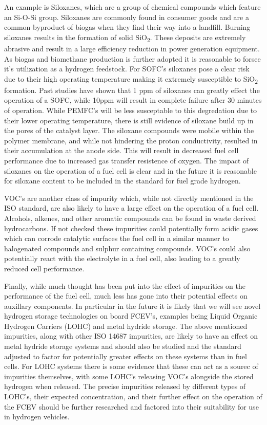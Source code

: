 An example is Siloxanes, which are a group of chemical compounds which feature an Si-O-Si group. Siloxanes are commonly found in consumer goods and are a common byproduct of biogas when they find their way into a landfill. Burning siloxanes results in the formation of solid SiO\textsubscript{2}. These deposits are extremely abrasive and result in a large efficiency reduction in power generation equipment. As biogas and biomethane production is further adopted it is reasonable to forsee it's utilization as a hydrogen feedstock. For SOFC's siloxanes pose a clear risk due to their high operating temperature making it extremely susceptible to SiO\textsubscript{2} formation. Past studies have shown that 1 ppm of siloxanes can greatly effect the operation of a SOFC, while 10ppm will result in complete failure after 30 minutes of operation. \cite{d.d._s._r._2011} While PEMFC's will be less susceptable to this degredation due to their lower operating temperature, there is still evidence of siloxane build up in the pores of the catalyst layer. \cite{SEO201644} The siloxane compounds were mobile within the polymer membrane, and while not hindering the proton conductivity, resulted in their accumulation at the anode side. \cite{SEO201644} This will result in decreased fuel cell performance due to increased gas transfer resistence of oxygen. The impact of siloxanes on the operation of a fuel cell is clear and in the future it is reasonable for siloxane content to be included in the standard for fuel grade hydrogen.

VOC's are another class of impurity which, while not directly mentioned in the ISO standard, are also likely to have a large effect on the operation of a fuel cell. Alcohols, alkenes, and other aromatic compounds can be found in waste derived hydrocarbons. If not checked these impurities could potentially form acidic gases which can corrode catalytic surfaces the fuel cell in a similar manner to halogenated compounds and sulphur containing compounds. \cite{d.d._s._r._2011} VOC's could also potentially react with the electrolyte in a fuel cell, also leading to a greatly reduced cell performance. \cite{Kortsdottir_2013}

Finally, while much thought has been put into the effect of impurities on the performance of the fuel cell, much less has gone into their potential effects on auxillary components. In particular in the future it is likely that we will see novel hydrogen storage technologies on board FCEV's, examples being Liquid Organic Hydrogen Carriers (LOHC) and metal hydride storage. The above mentioned impurities, along with other ISO 14687 impurities, are likely to have an effect on metal hydride storage systems and should also be studied and the standard adjusted to factor for potentially greater effects on these systems than in fuel cells. \cite{C001657H} For LOHC systems there is some evidence that these can act as a sourec of impurities themselves, with some LOHC's releasing VOC's alongside the stored hydrogen when released.\cite{BULGARIN2020712} The precise impurities released by different types of LOHC's, their expected concentration, and their further effect on the operation of the FCEV should be further researched and factored into their suitability for use in hydrogen vehicles. 


